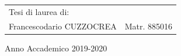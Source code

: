 \begin{titlepage}
\begin{flushright}
\begin{tabular}{ll}
Tesi di laurea di: & \tabularnewline
Francescodario CUZZOCREA & Matr. 885016\tabularnewline
\end{tabular}\vspace{1.5cm}
\par\end{flushright}

\begin{center}
{\large{}Anno Accademico 2019-2020}{\large\par}
\par\end{center}

\end{titlepage}
